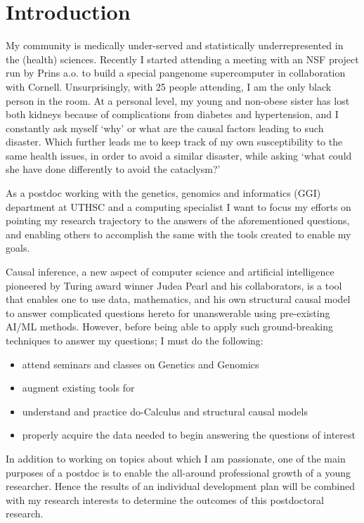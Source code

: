 \section*{Introduction} %


My community is medically under-served and statistically underrepresented in the (health) sciences. 
Recently I started attending a meeting with an NSF project run by Prins a.o. to build a special pangenome supercomputer in collaboration with Cornell. 
Unsurprisingly, with 25 people attending, I am the only black person in the room.
At a personal level, my young and non-obese sister has lost both kidneys because of complications from diabetes and hypertension, and I constantly ask myself `why' or what are the causal factors leading to such disaster.
Which further leads me to keep track of my own susceptibility to the same health issues, in order to avoid a similar disaster, while asking `what could she have done differently to avoid the cataclysm?'

As a postdoc working with the genetics, genomics and informatics (GGI) department at UTHSC and a computing specialist I want to focus my efforts on pointing my research trajectory to the answers of the aforementioned questions, and enabling others to accomplish the same with the tools created to enable my goals.

Causal inference, a new aspect of computer science and artificial intelligence pioneered by Turing award winner Judea Pearl\cite{Pearl:1995, Pearl:2009, Pearl:2018, Pearl:2019} and his collaborators, is a tool that enables one to use data, mathematics, and his own structural causal model to answer complicated questions hereto for unanswerable using pre-existing AI/ML methods.
However, before being able to apply such ground-breaking techniques to answer my questions; I must do the following:
\begin{itemize}[noitemsep]
    \item attend seminars and classes on Genetics and Genomics
    \item augment existing tools for \GN\
    \item understand and practice do-Calculus and structural causal models
    \item properly acquire the data needed to begin answering the questions of interest
\end{itemize}

In addition to working on topics about which I am passionate, one of the main purposes of a postdoc is to enable the all-around professional growth of a young researcher.
Hence the results of an individual development plan will be combined with my research interests to determine the outcomes of this postdoctoral research.
